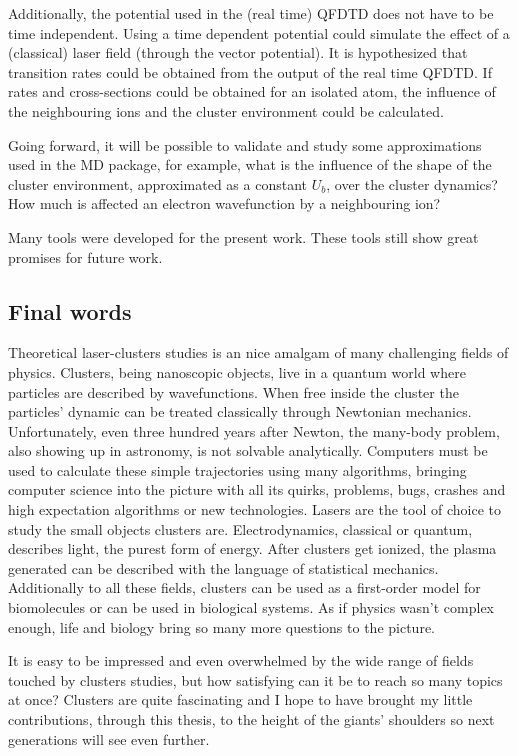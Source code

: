 Additionally, the potential used in the (real time) QFDTD does not have to be
time independent. Using a time dependent potential could simulate the effect of
a (classical) laser field (through the vector potential). It is hypothesized
that transition rates could be obtained from the output of the real time QFDTD.
If rates and cross-sections could be obtained for an isolated atom, the
influence of the neighbouring ions and the cluster environment could be
calculated.

Going forward, it will
be possible to validate and study some approximations used in the MD package,
for example, what is the influence of the shape of the cluster environment,
approximated as a constant $U_b$, over the cluster dynamics? How much is
affected an electron wavefunction by a neighbouring ion?

Many tools were developed for the present work. These tools still show
great promises for future work.



\subsection{Final words}

Theoretical laser-clusters studies is an nice amalgam of many challenging
fields of physics. Clusters, being nanoscopic objects, live in a quantum world
where particles are described by wavefunctions. When free inside the cluster
the particles' dynamic can be treated classically through Newtonian mechanics.
Unfortunately, even three hundred years after Newton, the many-body problem,
also showing up in astronomy, is not solvable analytically.
Computers must be used to calculate these simple trajectories
using many algorithms, bringing computer science into the picture
with all its quirks, problems, bugs, crashes and high expectation algorithms or
new technologies. Lasers are the tool of choice to study the small objects
clusters are. Electrodynamics, classical or quantum, describes light, the purest
form of energy. After clusters get ionized,
the plasma generated can be described with the language of statistical mechanics.
Additionally to all these fields, clusters can be used as a first-order model
for biomolecules or can be used in biological systems. As if physics wasn't
complex enough, life and biology bring so many more questions to the picture.

It is easy to be impressed and even overwhelmed by the wide range of fields
touched by clusters studies, but how satisfying can it be to reach so many
topics at once? Clusters are quite fascinating and I hope to have
brought my little contributions, through this thesis, to the height of the giants'
shoulders so next generations will see even further.
